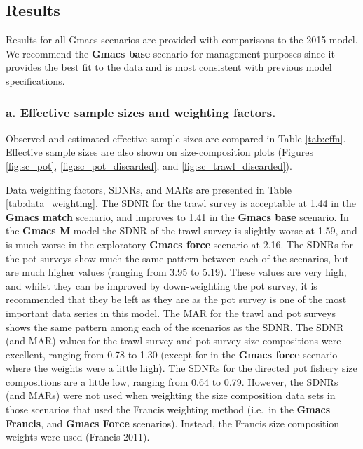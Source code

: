 \documentclass[]{article}
\begin{document}
\subsection{Results}\label{results}

Results for all Gmacs scenarios are provided with comparisons to the
2015 model. We recommend the \textbf{Gmacs base} scenario for management
purposes since it provides the best fit to the data and is most
consistent with previous model specifications.

\subsubsection{a. Effective sample sizes and weighting
factors.}\label{a.-effective-sample-sizes-and-weighting-factors.}

Observed and estimated effective sample sizes are compared in Table
\ref{tab:effn}. Effective sample sizes are also shown on
size-composition plots (Figures \ref{fig:sc_pot},
\ref{fig:sc_pot_discarded}, and \ref{fig:sc_trawl_discarded}).

Data weighting factors, SDNRs, and MARs are presented in Table
\ref{tab:data_weighting}. The SDNR for the trawl survey is acceptable at
1.44 in the \textbf{Gmacs match} scenario, and improves to 1.41 in the
\textbf{Gmacs base} scenario. In the \textbf{Gmacs M} model the SDNR of
the trawl survey is slightly worse at 1.59, and is much worse in the
exploratory \textbf{Gmacs force} scenario at 2.16. The SDNRs for the pot
surveys show much the same pattern between each of the scenarios, but
are much higher values (ranging from 3.95 to 5.19). These values are
very high, and whilst they can be improved by down-weighting the pot
survey, it is recommended that they be left as they are as the pot
survey is one of the most important data series in this model. The MAR
for the trawl and pot surveys shows the same pattern among each of the
scenarios as the SDNR. The SDNR (and MAR) values for the trawl survey
and pot survey size compositions were excellent, ranging from 0.78 to
1.30 (except for in the \textbf{Gmacs force} scenario where the weights
were a little high). The SDNRs for the directed pot fishery size
compositions are a little low, ranging from 0.64 to 0.79. However, the
SDNRs (and MARs) were not used when weighting the size composition data
sets in those scenarios that used the Francis weighting method (i.e.~in
the \textbf{Gmacs Francis}, and \textbf{Gmacs Force} scenarios).
Instead, the Francis size composition weights were used (Francis 2011).
\end{document}
